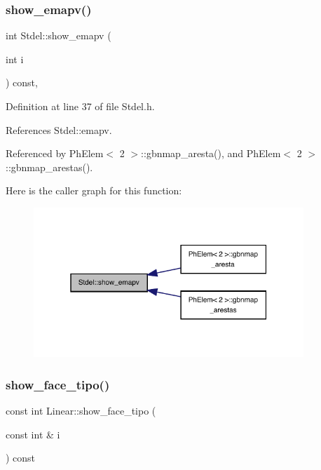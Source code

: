 \subsubsection{\texorpdfstring{show\+\_\+emapv()}{show\_emapv()}}
{\footnotesize\ttfamily int Stdel\+::show\+\_\+emapv (\begin{DoxyParamCaption}\item[{int}]{i }\end{DoxyParamCaption}) const\hspace{0.3cm}{\ttfamily [inline]}, {\ttfamily [inherited]}}



Definition at line 37 of file Stdel.\+h.



References Stdel\+::emapv.



Referenced by Ph\+Elem$<$ 2 $>$\+::gbnmap\+\_\+aresta(), and Ph\+Elem$<$ 2 $>$\+::gbnmap\+\_\+arestas().

Here is the caller graph for this function\+:
\nopagebreak
\begin{figure}[H]
\begin{center}
\leavevmode
\includegraphics[width=289pt]{classStdel_ad474ffc52b051ae8317b3fdb583c4c98_icgraph}
\end{center}
\end{figure}
\mbox{\label{classLinear_a696305db90ca619b2bbbb1fbbb360e8e}} 
\subsubsection{\texorpdfstring{show\+\_\+face\+\_\+tipo()}{show\_face\_tipo()}}
{\footnotesize\ttfamily const int Linear\+::show\+\_\+face\+\_\+tipo (\begin{DoxyParamCaption}\item[{const int \&}]{i }\end{DoxyParamCaption}) const\hspace{0.3cm}{\ttfamily [virtual]}}



